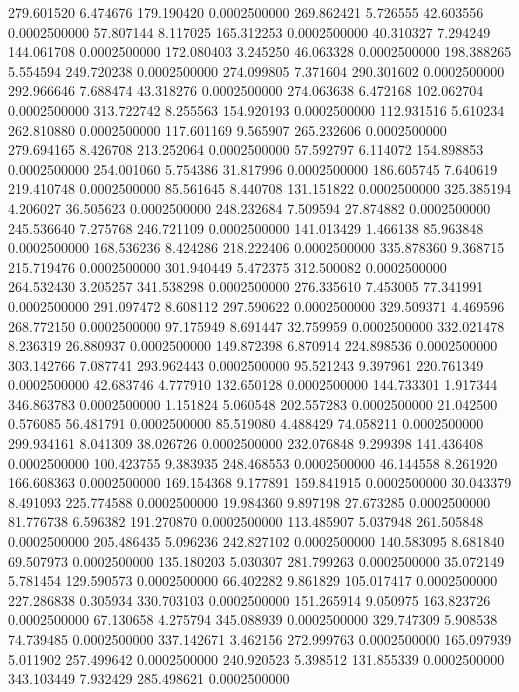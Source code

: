 279.601520 6.474676 179.190420 0.0002500000
269.862421 5.726555 42.603556 0.0002500000
57.807144 8.117025 165.312253 0.0002500000
40.310327 7.294249 144.061708 0.0002500000
172.080403 3.245250 46.063328 0.0002500000
198.388265 5.554594 249.720238 0.0002500000
274.099805 7.371604 290.301602 0.0002500000
292.966646 7.688474 43.318276 0.0002500000
274.063638 6.472168 102.062704 0.0002500000
313.722742 8.255563 154.920193 0.0002500000
112.931516 5.610234 262.810880 0.0002500000
117.601169 9.565907 265.232606 0.0002500000
279.694165 8.426708 213.252064 0.0002500000
57.592797 6.114072 154.898853 0.0002500000
254.001060 5.754386 31.817996 0.0002500000
186.605745 7.640619 219.410748 0.0002500000
85.561645 8.440708 131.151822 0.0002500000
325.385194 4.206027 36.505623 0.0002500000
248.232684 7.509594 27.874882 0.0002500000
245.536640 7.275768 246.721109 0.0002500000
141.013429 1.466138 85.963848 0.0002500000
168.536236 8.424286 218.222406 0.0002500000
335.878360 9.368715 215.719476 0.0002500000
301.940449 5.472375 312.500082 0.0002500000
264.532430 3.205257 341.538298 0.0002500000
276.335610 7.453005 77.341991 0.0002500000
291.097472 8.608112 297.590622 0.0002500000
329.509371 4.469596 268.772150 0.0002500000
97.175949 8.691447 32.759959 0.0002500000
332.021478 8.236319 26.880937 0.0002500000
149.872398 6.870914 224.898536 0.0002500000
303.142766 7.087741 293.962443 0.0002500000
95.521243 9.397961 220.761349 0.0002500000
42.683746 4.777910 132.650128 0.0002500000
144.733301 1.917344 346.863783 0.0002500000
1.151824 5.060548 202.557283 0.0002500000
21.042500 0.576085 56.481791 0.0002500000
85.519080 4.488429 74.058211 0.0002500000
299.934161 8.041309 38.026726 0.0002500000
232.076848 9.299398 141.436408 0.0002500000
100.423755 9.383935 248.468553 0.0002500000
46.144558 8.261920 166.608363 0.0002500000
169.154368 9.177891 159.841915 0.0002500000
30.043379 8.491093 225.774588 0.0002500000
19.984360 9.897198 27.673285 0.0002500000
81.776738 6.596382 191.270870 0.0002500000
113.485907 5.037948 261.505848 0.0002500000
205.486435 5.096236 242.827102 0.0002500000
140.583095 8.681840 69.507973 0.0002500000
135.180203 5.030307 281.799263 0.0002500000
35.072149 5.781454 129.590573 0.0002500000
66.402282 9.861829 105.017417 0.0002500000
227.286838 0.305934 330.703103 0.0002500000
151.265914 9.050975 163.823726 0.0002500000
67.130658 4.275794 345.088939 0.0002500000
329.747309 5.908538 74.739485 0.0002500000
337.142671 3.462156 272.999763 0.0002500000
165.097939 5.011902 257.499642 0.0002500000
240.920523 5.398512 131.855339 0.0002500000
343.103449 7.932429 285.498621 0.0002500000
